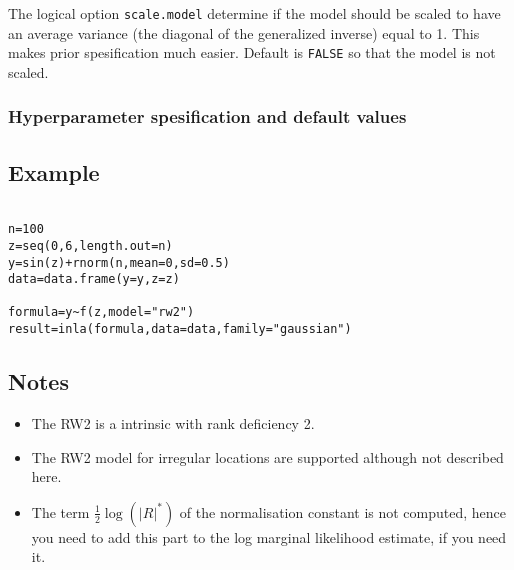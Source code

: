 \documentclass[a4paper,11pt]{article}
\begin{document}
The logical option \verb|scale.model| determine if the model should be
scaled to have an average variance (the diagonal of the generalized
inverse) equal to 1. This makes prior spesification much
easier. Default is \verb|FALSE| so that the model is not scaled.


\subsubsection*{Hyperparameter spesification and default values}



\subsection*{Example}

\begin{verbatim}

n=100
z=seq(0,6,length.out=n)
y=sin(z)+rnorm(n,mean=0,sd=0.5)
data=data.frame(y=y,z=z)

formula=y~f(z,model="rw2")
result=inla(formula,data=data,family="gaussian")
\end{verbatim}


\subsection*{Notes}

\begin{itemize}
\item The RW2 is a intrinsic with rank deficiency 2.
\item The RW2 model for irregular locations are supported although not
    described here.
\item The term $\frac{1}{2}\log(|R|^{*})$ of the normalisation
    constant is not computed, hence you need to add this part to the
    log marginal likelihood estimate, if you need it.
\end{itemize}
\end{document}
